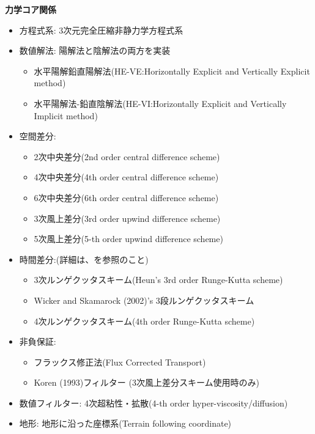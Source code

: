 {\bf 力学コア関係}
\begin{itemize}
 \item 方程式系: 3次元完全圧縮非静力学方程式系
 \item 数値解法: 陽解法と陰解法の両方を実装
   \begin{itemize}
    \item 水平陽解鉛直陽解法(HE-VE:Horizontally Explicit and Vertically Explicit method)
    \item 水平陽解法-鉛直陰解法(HE-VI:Horizontally Explicit and Vertically Implicit method)
   \end{itemize}
 \item 空間差分:
    \begin{itemize}
      \item 2次中央差分(2nd order central difference scheme)
      \item 4次中央差分(4th order central difference scheme)
      \item 6次中央差分(6th order central difference scheme)
      \item 3次風上差分(3rd order upwind difference scheme)
      \item 5次風上差分(5-th order upwind difference scheme)
    \end{itemize}
 \item 時間差分:(詳細は、\citet{scale_2015}を参照のこと)
    \begin{itemize}
      \item 3次ルンゲクッタスキーム(Heun's 3rd order Runge-Kutta scheme)
      \item Wicker and Skamarock (2002)'s 3段ルンゲクッタスキーム \citep[3-step Runge-Kutta scheme of ][]{Wicker_2002}
      \item 4次ルンゲクッタスキーム(4th order Runge-Kutta scheme)
    \end{itemize}
 \item 非負保証:
    \begin{itemize}
      \item フラックス修正法(Flux Corrected Transport)
      \item Koren (1993)フィルター \citep{Koren_1993} (3次風上差分スキーム使用時のみ)
    \end{itemize}
 \item 数値フィルター: 4次超粘性・拡散(4-th order hyper-viscosity/diffusion)
 \item 地形: 地形に沿った座標系(Terrain following coordinate)
\end{itemize}


